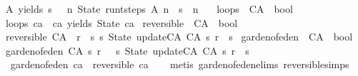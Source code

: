 \begin{isabellebody}
{\isachardoublequoteopen}A\ yields\ s\ {\isasymequiv}\ {\isacharparenleft}{\isasymexists}\ n{\isachardot}\ State\ {\isacharparenleft}run{\isacharunderscore}t{\isacharunderscore}steps\ A\ n{\isacharparenright}\ {\isacharequal}\ s\ {\isasymand}\ n\ {\isachargreater}\ {}{\isacharparenright}{\isachardoublequoteclose}\isanewline
\isanewline
{}\isamarkupfalse%
\ loops\ {\isacharcolon}{\isacharcolon}\ {\isachardoublequoteopen}CA\ {\isasymRightarrow}\ bool{\isachardoublequoteclose}\ \isanewline
{\isachardoublequoteopen}loops\ ca\ {\isasymequiv}\ ca\ yields\ State\ ca{\isachardoublequoteclose}\isanewline
\isanewline
{}\isamarkupfalse%
\ reversible\ {\isacharcolon}{\isacharcolon}\ {\isachardoublequoteopen}CA\ {\isasymRightarrow}\ bool{\isachardoublequoteclose}\ \isanewline
{\isachardoublequoteopen}reversible\ {\isacharparenleft}CA\ {\isacharunderscore}\ r{\isacharparenright}\ {\isacharequal}\ {\isacharparenleft}{\isasymforall}s{\isachardot}\ {\isacharparenleft}{\isasymexists}{\isacharbang}s{}{\isachardot}\ State\ {\isacharparenleft}update{\isacharunderscore}CA\ {\isacharparenleft}CA\ s{}\ r{\isacharparenright}{\isacharparenright}\ {\isacharequal}\ s{\isacharparenright}{\isacharparenright}{\isachardoublequoteclose}\isanewline
\isanewline
{}\isamarkupfalse%
\ garden{\isacharunderscore}of{\isacharunderscore}eden\ {\isacharcolon}{\isacharcolon}\ {\isachardoublequoteopen}CA\ {\isasymRightarrow}\ bool{\isachardoublequoteclose}\ \isanewline
{\isachardoublequoteopen}garden{\isacharunderscore}of{\isacharunderscore}eden\ {\isacharparenleft}CA\ s\ r{\isacharparenright}\ {\isacharequal}\ {\isacharparenleft}{\isasymnot}{\isacharparenleft}{\isasymexists}\ s{}{\isachardot}\ State\ {\isacharparenleft}update{\isacharunderscore}CA\ {\isacharparenleft}CA\ s{}\ r{\isacharparenright}{\isacharparenright}\ {\isacharequal}\ s{\isacharparenright}{\isacharparenright}{\isachardoublequoteclose}\isanewline
\isanewline
{}\isamarkupfalse%
\ {\isachardoublequoteopen}garden{\isacharunderscore}of{\isacharunderscore}eden\ ca\ {\isasymLongrightarrow}\ {\isasymnot}reversible\ ca{\isachardoublequoteclose}\isanewline
%
\isadelimproof
\ \ %
\endisadelimproof
%
\isatagproof
{}\isamarkupfalse%
\ {\isacharparenleft}metis\ garden{\isacharunderscore}of{\isacharunderscore}eden{\isachardot}elims{\isacharparenleft}{}{\isacharparenright}\ reversible{\isachardot}simps{\isacharparenright}%
\endisatagproof
{\isafoldproof}%

\end{isabellebody}
